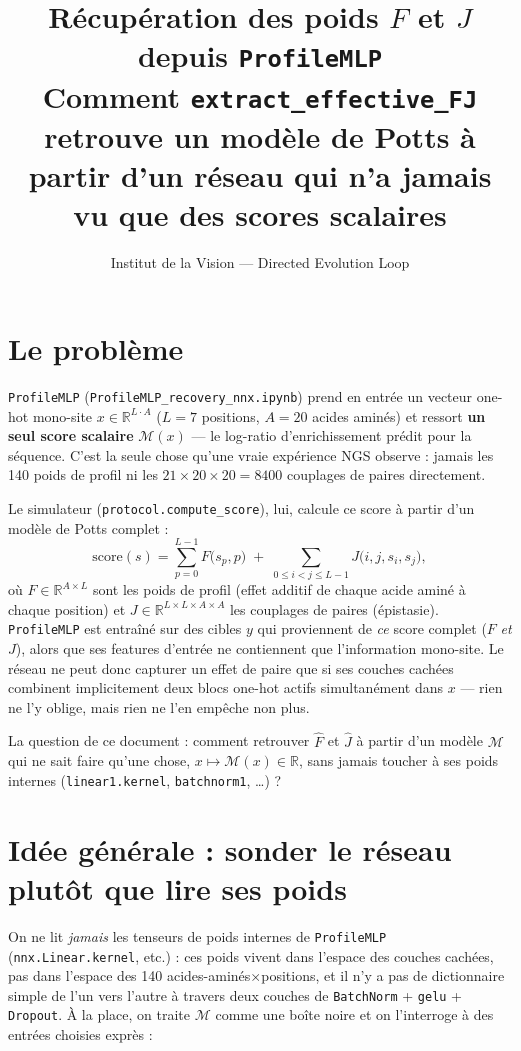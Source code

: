 \documentclass[11pt,a4paper]{article}
\title{\textbf{Récupération des poids $F$ et $J$ depuis \texttt{ProfileMLP}}\\
\large Comment \texttt{extract\_effective\_FJ} retrouve un modèle de Potts à partir d'un
réseau qui n'a jamais vu que des scores scalaires}
\author{Institut de la Vision --- Directed Evolution Loop}
\date{}
\newcommand{\R}{\mathbb{R}}
\newcommand{\M}{\mathcal{M}}
\begin{document}
\maketitle
\tableofcontents
\newpage

\section{Le problème}

\texttt{ProfileMLP} (\texttt{ProfileMLP\_recovery\_nnx.ipynb}) prend en entrée un vecteur
one-hot mono-site $x \in \R^{L\cdot A}$ ($L=7$ positions, $A=20$ acides aminés) et ressort
\textbf{un seul score scalaire} $\M(x)$ --- le log-ratio d'enrichissement prédit pour la
séquence. C'est la seule chose qu'une vraie expérience NGS observe : jamais les 140 poids de
profil ni les $21\times20\times20 = 8400$ couplages de paires directement.

Le simulateur (\texttt{protocol.compute\_score}), lui, calcule ce score à partir d'un modèle
de Potts complet :
\[
    \text{score}(s) = \sum_{p=0}^{L-1} F\big(s_p, p\big) \;+\; \sum_{0\le i<j\le L-1} J\big(i,j,s_i,s_j\big),
\]
où $F \in \R^{A\times L}$ sont les poids de profil (effet additif de chaque acide aminé à
chaque position) et $J \in \R^{L\times L\times A\times A}$ les couplages de paires
(épistasie). \texttt{ProfileMLP} est entraîné sur des cibles $y$ qui proviennent de \emph{ce}
score complet ($F$ \emph{et} $J$), alors que ses features d'entrée ne contiennent que
l'information mono-site. Le réseau ne peut donc capturer un effet de paire que si ses couches
cachées combinent implicitement deux blocs one-hot actifs simultanément dans $x$ --- rien ne
l'y oblige, mais rien ne l'en empêche non plus.

La question de ce document : comment retrouver $\hat F$ et $\hat J$ à partir d'un modèle
$\M$ qui ne sait faire qu'une chose, $x \mapsto \M(x) \in \R$, sans jamais toucher à ses poids
internes (\texttt{linear1.kernel}, \texttt{batchnorm1}, \ldots) ?

\section{Idée générale : sonder le réseau plutôt que lire ses poids}

On ne lit \emph{jamais} les tenseurs de poids internes de \texttt{ProfileMLP}
(\texttt{nnx.Linear.kernel}, etc.) : ces poids vivent dans l'espace des couches cachées, pas
dans l'espace des 140 acides-aminés$\times$positions, et il n'y a pas de dictionnaire simple
de l'un vers l'autre à travers deux couches de \texttt{BatchNorm} + \texttt{gelu} +
\texttt{Dropout}. À la place, on traite $\M$ comme une boîte noire et on l'interroge à des
entrées choisies exprès :
\end{document}
